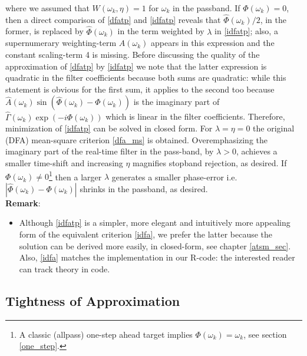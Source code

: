 \documentclass[a4paper]{book}
\begin{document}
where we assumed that $W(\omega_k,\eta)=1$ for $\omega_k$ in the passband. If $\Phi(\omega_k)=0$, then a direct comparison of \ref{dfatp} and \ref{idfatp} reveals that $\hat{\Phi}(\omega_k)/2$, in the former, is replaced
by $\hat{\Phi}(\omega_k)$ in the term weighted by $\lambda$ in \ref{idfatp}; also, a supernumerary weighting-term $\hat{A}(\omega_k)$ appears in this expression and the constant scaling-term 4 is missing. Before discussing the quality of the approximation of \ref{dfatp} by \ref{idfatp} we note that the latter expression is quadratic in the filter coefficients because both sums are quadratic: while this statement is obvious for the first sum, it applies to the second too because $\hat{A}(\omega_k)\sin(\hat{\Phi}(\omega_k)-\Phi(\omega_k))$ is the
imaginary part of $\hat{\Gamma}(\omega_k)\exp(-i\Phi(\omega_k))$ which is linear in the filter coefficients. Therefore, minimization of \ref{idfatp} can be solved in closed form. 
For $\lambda=\eta=0$ the original (DFA) mean-square
criterion \ref{dfa_ms} is obtained. Overemphasizing the imaginary part of the real-time filter
in the pass-band, by $\lambda>0$, achieves a smaller time-shift and increasing $\eta$ magnifies stopband rejection, as desired. If $\Phi(\omega_k)\not=0$\footnote{A classic (allpass) one-step ahead target implies $\Phi(\omega_k)=\omega_k$, see section \ref{one_step}.} then a larger $\lambda$ generates a smaller phase-error i.e. $|\hat{\Phi}(\omega_k)-\Phi(\omega_k)|$ shrinks in the passband, as desired. \\

\textbf{Remark}: 
\begin{itemize}
\item Although \ref{idfatp} is a simpler, more elegant and intuitively more appealing form of the equivalent criterion \ref{idfa}, we prefer the latter because the solution can be derived more easily, in closed-form, see chapter \ref{atsm_sec}. Also, \ref{idfa} matches the implementation in our R-code: the interested reader can track theory in code. 
\end{itemize}


\subsection{Tightness of Approximation} \label{ti_o_app_idfa}
\end{document}
